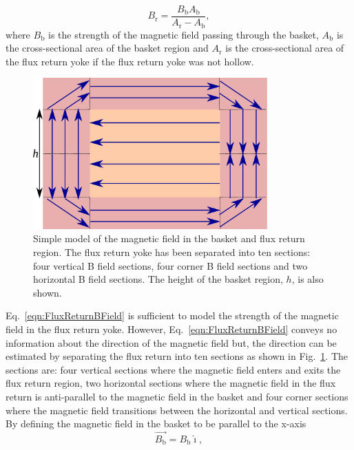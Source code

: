 \begin{equation}
  B_{\textrm{r}} = \frac{B_{\textrm{b}}A_{\textrm{b}}}{A_{\textrm{r}} - A_{\textrm{b}}},
  \label{eqn:FluxReturnBField}
\end{equation}
where $B_{\textrm{b}}$ is the strength of the magnetic field passing through the basket, $A_{\textrm{b}}$ is the cross-sectional area of the basket region and $A_{\textrm{r}}$ is the cross-sectional area of the flux return yoke if the flux return yoke was not hollow.
\newline
\newline
\begin{figure}
  \centering
  \includegraphics[width=9cm]{images/magnetic_field/BFieldDiagram}
  \caption{Simple model of the magnetic field in the basket and flux return region.  The flux return yoke has been separated into ten sections: four vertical B field sections, four corner B field sections and two horizontal B field sections.  The height of the basket region, $h$, is also shown.}
  \label{fig:BFieldDiagram}
\end{figure}
Eq.~\ref{eqn:FluxReturnBField} is sufficient to model the strength of the magnetic field in the flux return yoke.  However, Eq.~\ref{eqn:FluxReturnBField} conveys no information about the direction of the magnetic field but, the direction can be estimated by separating the flux return into ten sections as shown in Fig.~\ref{fig:BFieldDiagram}.  The sections are: four vertical sections where the magnetic field enters and exits the flux return region, two horizontal sections where the magnetic field in the flux return is anti-parallel to the magnetic field in the basket and four corner sections where the magnetic field transitions between the horizontal and vertical sections.  By defining the magnetic field in the basket to be parallel to the x-axis 
\begin{equation}
  \overrightarrow{B_{\textrm{b}}} = {B_{\textrm{b}}}\hat{\imath},
  \label{eqn:BasketBFieldVector}
\end{equation}
